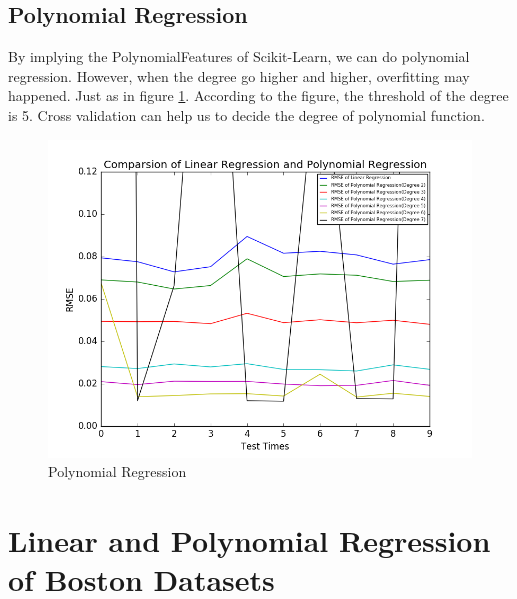 \documentclass{article}
\begin{document}
\subsection{Polynomial Regression}
By implying the PolynomialFeatures of Scikit-Learn, we can do polynomial regression. However, when the degree go higher and higher, overfitting may happened. Just as in figure \ref{fig:pr1}. According to the figure, the threshold of the degree is 5. Cross validation can help us to decide the degree of polynomial function.
\begin{figure}[htbp]
\centering
\includegraphics[width=.6\textwidth]{pr1.png}
\caption{Polynomial Regression}
\label{fig:pr1}
\end{figure}
\section{Linear and Polynomial Regression of Boston Datasets}
\end{document}
